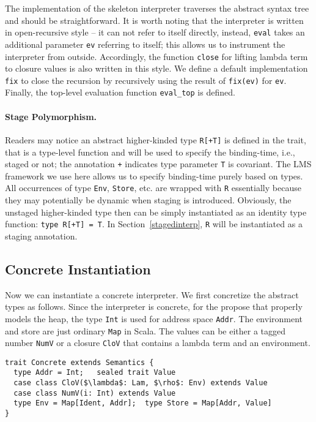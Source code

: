 The implementation of the skeleton interpreter traverses the abstract syntax tree and should be straightforward.
It is worth noting that the interpreter is written in open-recursive style -- 
it can not refer to itself directly, instead, \texttt{eval} takes an additional 
parameter \texttt{ev} referring to itself; this allows us to instrument the interpreter
from outside. Accordingly, the function \texttt{close} for lifting lambda term to closure values
is also written in this style.
We define a default implementation \texttt{fix} to close the recursion by recursively using the result 
of \texttt{fix(ev)} for \texttt{ev}. 
Finally, the top-level evaluation function \texttt{eval\_top} is defined.

\paragraph{Stage Polymorphism.}
Readers may notice an abstract higher-kinded type \texttt{R[+T]} is defined in the trait, that is a
type-level function and will be used to specify the binding-time, i.e., staged or not; the annotation 
\texttt{+} indicates type parameter \texttt{T} is covariant.
The LMS framework we use here allows us to specify binding-time purely based on types.
All occurrences of type \texttt{Env}, \texttt{Store}, etc. are wrapped with \texttt{R} 
essentially because they may potentially be dynamic when staging is introduced.
Obviously, the unstaged higher-kinded type then can be simply instantiated as an identity type function: 
\texttt{type R[+T] = T}. In Section~\ref{stagedinterp}, \texttt{R} will be instantiated 
as a staging annotation. 

\subsection{Concrete Instantiation}
Now we can instantiate a concrete interpreter. We first concretize the abstract types as follows.
Since the interpreter is concrete, for the propose that properly models the heap, the type \texttt{Int} 
is used for address space \texttt{Addr}. The environment and store are just ordinary \texttt{Map} in Scala.
The values can be either a tagged number \texttt{NumV} or a closure \texttt{CloV} that contains a lambda term
and an environment.

\begin{lstlisting}
trait Concrete extends Semantics {
  type Addr = Int;   sealed trait Value
  case class CloV($\lambda$: Lam, $\rho$: Env) extends Value
  case class NumV(i: Int) extends Value
  type Env = Map[Ident, Addr];  type Store = Map[Addr, Value]
}
\end{lstlisting}

